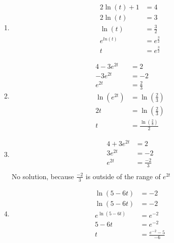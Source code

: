 \documentclass[nooutcomes]{ximera}
\begin{document}
\begin{example}
\begin{explanation}
\begin{enumerate}[label=\alph*.]
\item
\begin{align*}
2\ln(t) + 1 &= 4\\
2\ln(t) &= 3\\
\ln(t) &= \frac{3}{2}\\
e^{ln(t)} &= e^{\frac{3}{2}}\\
t &= e^{\frac{3}{2}}
\end{align*}
\item
\begin{align*}
4 - 3e^{2t} &= 2\\
-3e^{2t} &= -2\\
e^{2t} &= \frac{2}{3}\\
\ln(e^{2t}) &= \ln\left({\frac{2}{3}}\right)\\
2t &= \ln\left({\frac{2}{3}}\right)\\
t &= \frac{\ln\left({\frac{2}{3}}\right)}{2}
\end{align*}
\item
\begin{align*}
4 + 3e^{2t} &= 2\\
3e^{2t} &= -2\\
e^{2t} &= \frac{-2}{3}\\
\end{align*}
No solution, because $\frac{-2}{3}$ is outside of the range of $e^{2t}$
\item
\begin{align*}
\ln(5 - 6t) &= -2\\
\ln(5 - 6t) &= -2\\
e^{\ln(5-6t)} &=e^{-2}\\
5-6t &=e^{-2}\\
t &=\frac{e^{-2}-5}{-6}
\end{align*}
\end{enumerate}
\end{explanation}
%
\end{example}

%
%
%
\end{document}
